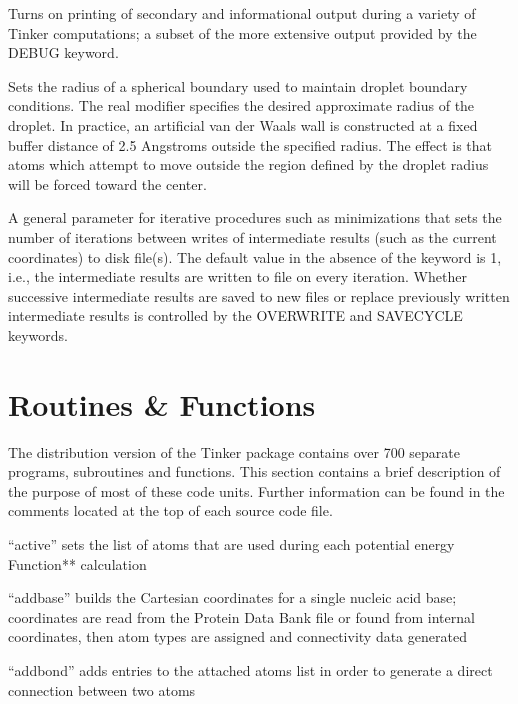 \documentclass[letterpaper,11pt,english]{sphinxmanual}
\begin{document}
  Turns on printing of secondary and informational output during a variety of Tinker computations; a subset of the more extensive output provided by the DEBUG keyword.

  Sets the radius of a spherical boundary used to maintain droplet boundary conditions. The real modifier specifies the desired approximate radius of the droplet. In practice, an artificial van der Waals wall is constructed at a fixed buffer distance of 2.5 Angstroms outside the specified radius. The effect is that atoms which attempt to move outside the region defined by the droplet radius will be forced toward the center.

  A general parameter for iterative procedures such as minimizations that sets the number of iterations between writes of intermediate results (such as the current coordinates) to disk file(s). The default value in the absence of the keyword is 1, i.e., the intermediate results are written to file on every iteration. Whether successive intermediate results are saved to new files or replace previously written intermediate results is controlled by the OVERWRITE and SAVE\sphinxhyphen{}CYCLE keywords.


\chapter{Routines \& Functions}
\label{\detokenize{text/routines:routines-functions}}\label{\detokenize{text/routines::doc}}
The distribution version of the Tinker package contains over 700 separate programs, subroutines and functions. This section contains a brief description of the purpose of most of these code units. Further information can be found in the comments located at the top of each source code file.


“active” sets the list of atoms that are used during each potential energy Function** calculation


“addbase” builds the Cartesian coordinates for a single nucleic acid base; coordinates are read from the Protein Data Bank file or found from internal coordinates, then atom types are assigned and connectivity data generated


“addbond” adds entries to the attached atoms list in order to generate a direct connection between two atoms
\end{document}
